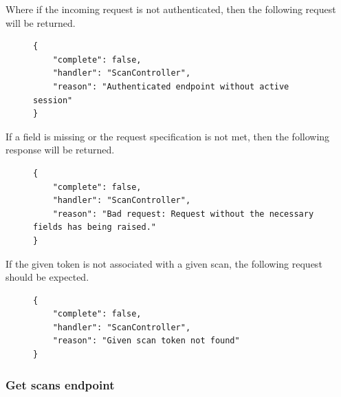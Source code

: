 					Where if the incoming request is not authenticated, then the following request will be returned.
					\begin{figure}[H]
						\iftrue
						\begin{lstlisting}[]
{
	"complete": false,
	"handler": "ScanController",
	"reason": "Authenticated endpoint without active session"
}
						\end{lstlisting}
					\end{figure}
					If a field is missing or the request specification is not met, then the following response will be returned.
					\begin{figure}[H]
						\iftrue
						\begin{lstlisting}[]
{
	"complete": false,
	"handler": "ScanController",
	"reason": "Bad request: Request without the necessary fields has being raised."
}					
						\end{lstlisting}
					\end{figure}
					If the given token is not associated with a given scan, the following request should be expected.
					\begin{figure}[H]
						\iftrue
						\begin{lstlisting}[]
{
	"complete": false,
	"handler": "ScanController",
	"reason": "Given scan token not found"
}		
						\end{lstlisting}
					\end{figure}
					
				\subsubsection{Get scans endpoint}
				
